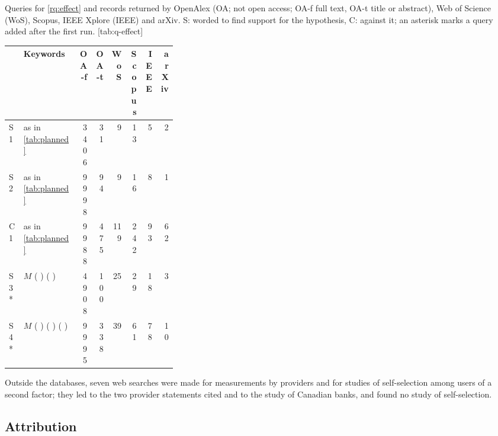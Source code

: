 \begin{table}[h]
  \begin{sidecaption}{%
    Queries for \cref{rq:effect} and records returned by OpenAlex (OA;
    not open access; OA-f full text, OA-t title or abstract), Web of
    Science (WoS), Scopus, IEEE Xplore (IEEE) and arXiv.
    S: worded to find support for the hypothesis, C: against it; an
    asterisk marks a query added after the first run.
  }[tab:q-effect]
    \footnotesize
    \begin{tabular}{@{}lL{0.33\linewidth}rrrrrr@{}}
      \toprule
      & Keywords & OA-f & OA-t & WoS & Scopus & IEEE & arXiv \\
      \midrule
      S1 & as in \cref{tab:planned} & 3406 & 31 & 9 & 13 & 5 & 2 \\
      S2 & as in \cref{tab:planned} & 9998 & 94 & 9 & 16 & 8 & 1 \\
      C1 & as in \cref{tab:planned} & 9988 & 475 & 119 & 242 & 93 & 62 \\
      S3* & $M$  (      
         )  ( 
            
           )
        & 4908 & 100 & 25 & 29 & 18 & 3 \\
      S4* & $M$  (   
        )  (  
           ) 
        (    )
        & 9995 & 338 & 39 & 61 & 78 & 10 \\
      \bottomrule
    \end{tabular}
  \end{sidecaption}
\end{table}
Outside the databases, seven web searches were made for measurements by
providers and for studies of self-selection among users of a second
factor; they led to the two provider statements cited and to the study
of Canadian banks, and found no study of self-selection.



\clearpage
\subsection{Attribution}


